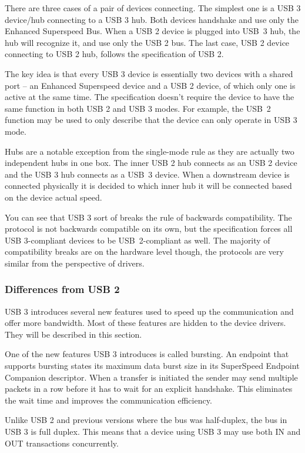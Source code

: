 There are three cases of a pair of devices connecting. The simplest one is
a USB 3 device/hub connecting to a USB 3 hub. Both devices handshake and use
only the Enhanced Superspeed Bus. When a USB 2 device is plugged into USB~3
hub, the hub will recognize it, and use only the USB 2 bus. The last case, USB
2 device connecting to USB 2 hub, follows the specification of USB 2.

The key idea is that every USB 3 device is essentially two devices with a shared
port -- an Enhanced Superspeed device and a USB 2 device, of which only one is
active at the same time. The specification doesn't require the device to have
the same function in both USB 2 and USB 3 modes. For example, the USB~2
function may be used to only describe that the device can only operate in USB 3 mode.

Hubs are a notable exception from the single-mode rule as they are actually
two independent hubs in one box. The inner USB 2 hub connects as an USB
2 device and the USB 3 hub connects as a USB~3 device. When a downstream
device is connected physically it is decided to which inner hub it will be
connected based on the device actual speed.

You can see that USB 3 sort of breaks the rule of backwards compatibility. The
protocol is not backwards compatible on its own, but the specification forces
all USB 3-compliant devices to be USB~2-compliant as well. The majority of
compatibility breaks are on the hardware level though, the protocols are very
similar from the perspective of drivers.

\subsubsection{Differences from USB 2}

USB 3 introduces several new features used to speed up the communication and
offer more bandwidth. Most of these features are hidden to the device drivers.
They will be described in this section.

One of the new features USB 3 introduces is called bursting. An endpoint that
supports bursting states its maximum data burst size in its SuperSpeed Endpoint
Companion descriptor. When a transfer is initiated the sender may send multiple
packets in a row before it has to wait for an explicit handshake. This
eliminates the wait time and improves the communication efficiency.

Unlike USB 2 and previous versions where the bus was half-duplex, the bus in USB
3 is full duplex. This means that a device using USB 3 may use both IN and OUT
transactions concurrently.

